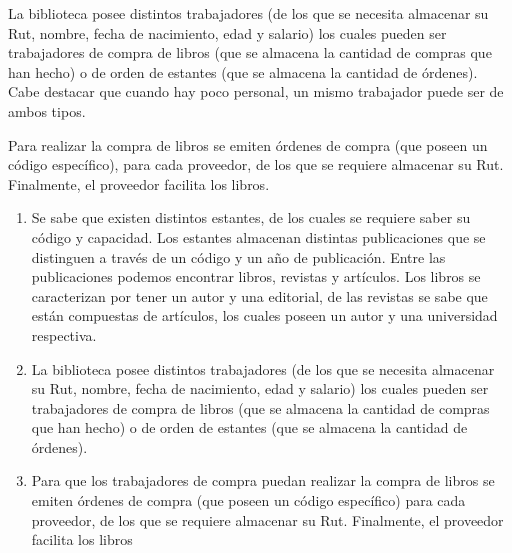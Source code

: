 \documentclass[letterpaper]{article}
\begin{document}
La biblioteca posee distintos trabajadores (de los que se necesita almacenar su Rut, nombre, fecha de nacimiento, edad y salario) los cuales pueden ser trabajadores de compra de libros (que se almacena la cantidad de compras que han hecho) o de orden de estantes (que se almacena la cantidad de órdenes). Cabe destacar que cuando hay poco personal, un mismo trabajador puede ser de ambos tipos. 

Para realizar la compra de libros se emiten órdenes de compra (que poseen un código específico), para cada proveedor, de los que se requiere almacenar su Rut. Finalmente, el proveedor facilita los libros.

\begin{enumerate}

\item	Se sabe que existen distintos estantes, de los cuales se requiere saber su código y capacidad. Los estantes almacenan distintas publicaciones que se distinguen a través de un código y un año de publicación. Entre las publicaciones podemos encontrar libros, revistas y artículos. Los libros se caracterizan por tener un autor y una editorial, de las revistas se sabe que están compuestas de artículos, los cuales poseen un autor y una universidad respectiva.
 

\item	La biblioteca posee distintos trabajadores (de los que se necesita almacenar su Rut, nombre, fecha de nacimiento, edad y salario) los cuales pueden ser trabajadores de compra de libros (que se almacena la cantidad de compras que han hecho) o de orden de estantes (que se almacena la cantidad de órdenes).
 

\item	Para que los trabajadores de compra puedan realizar la compra de libros se emiten órdenes de compra (que poseen un código específico) para cada proveedor, de los que se requiere almacenar su Rut. Finalmente, el proveedor facilita los libros
 
\end{enumerate}
\end{document}
